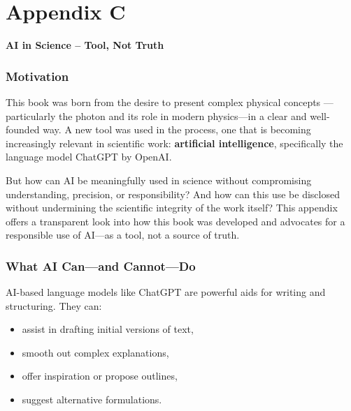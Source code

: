 \appendix
\renewcommand{\thesection}{\thechapter.\arabic{section}}
\chapter*{Appendix C}
\renewcommand{\thechapter}{C}
\renewcommand{\cftsecnumwidth}{3em}
\setcounter{chapter}{3}
\setcounter{section}{0}

\vspace{1em}
\begin{center}
	\LARGE\textbf{AI in Science – Tool, Not Truth}
\end{center}

\label{chap:AI-in-Science}
\thispagestyle{plain}

\subsection*{Motivation}
This book was born from the desire to present complex physical concepts
—particularly the photon and its role in modern physics—in a clear and well-founded way. A new tool was used in the process, one that is becoming increasingly relevant in scientific work: \textbf{artificial intelligence}, specifically the language model ChatGPT by OpenAI.

But how can AI be meaningfully used in science without compromising understanding, precision, or responsibility? And how can this use be disclosed without undermining the scientific integrity of the work itself? This appendix offers a transparent look into how this book was developed and advocates for a responsible use of AI—as a tool, not a source of truth.

\subsection*{What AI Can—and Cannot—Do}

AI-based language models like ChatGPT are powerful aids for writing and structuring. They can:
\begin{itemize}
	\item assist in drafting initial versions of text,
	\item smooth out complex explanations,
	\item offer inspiration or propose outlines,
	\item suggest alternative formulations.
\end{itemize}

